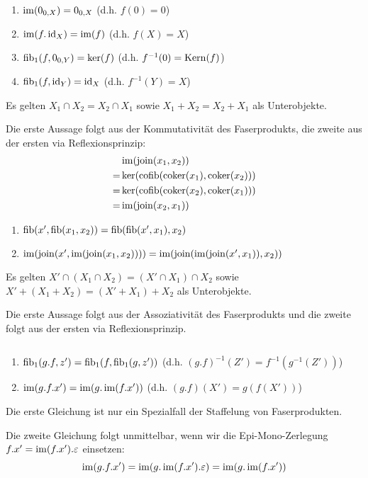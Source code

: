 \begin{lemm}[Regel (a)] $\quad$ %
\begin{enumerate}
\item $\operatorname{im}(0_{0,X}) = 0_{0,X}$ (d.h. $f(0) = 0$)
\item $\operatorname{im}(f.\operatorname{id}_X) = \operatorname{im}(f)$ (d.h. $f(X) = X$)
\item $\operatorname{fib}_1(f,0_{0,Y}) = \ker(f)$ (d.h. $f^{-1}(0) = \operatorname{Kern}(f)$)
\item $\operatorname{fib}_1(f,\operatorname{id}_Y) = \operatorname{id}_X$ (d.h. $f^{-1}(Y) = X$)
\end{enumerate}
\end{lemm}

\begin{lemm}[Regel (b)]
Es gelten $X_1 \cap X_2 = X_2 \cap X_1$
sowie $X_1 + X_2 = X_2 + X_1$ als Unterobjekte.
\end{lemm}
\begin{bew}
Die erste Aussage folgt aus der Kommutativität des Faserprodukts, die zweite aus der ersten via Reflexionsprinzip:
\begin{align*}
   & \operatorname{im}(\operatorname{join}(x_1,x_2))
\\=& \ker(\operatorname{cofib}(\operatorname{coker}(x_1),\operatorname{coker}(x_2)))
\\=& \ker(\operatorname{cofib}(\operatorname{coker}(x_2),\operatorname{coker}(x_1)))
\\=& \operatorname{im}(\operatorname{join}(x_2,x_1))
\end{align*}
\end{bew}

\begin{lemm}[Regel (c)]
\begin{enumerate}
\item $\operatorname{fib}(x',\operatorname{fib}(x_1,x_2)) = \operatorname{fib}(\operatorname{fib}(x',x_1),x_2)$
\item $\operatorname{im}(\operatorname{join}(x',\operatorname{im}(\operatorname{join}(x_1,x_2)))) = \operatorname{im}(\operatorname{join}(\operatorname{im}(\operatorname{join}(x',x_1)),x_2))$
\end{enumerate}
Es gelten $X' \cap (X_1 \cap X_2) = (X' \cap X_1) \cap X_2$ 
sowie $X' + (X_1 + X_2) = (X' + X_1) + X_2$ als Unterobjekte.
\end{lemm}
\begin{bew}
Die erste Aussage folgt aus der Assoziativität des Faserprodukts und die zweite folgt aus der ersten via Reflexionsprinzip.
\end{bew}

\begin{lemm}[Regel (d)] $\quad$ %
\begin{enumerate}
\item $\operatorname{fib}_1(g.f, z') = \operatorname{fib}_1(f, \operatorname{fib}_1(g, z'))$ (d.h. $(g.f)^{-1}(Z') = f^{-1}(g^{-1}(Z'))$)
\item $\operatorname{im}(g.f.x') = \operatorname{im}(g.\operatorname{im}(f.x'))$ (d.h. $(g.f)(X') = g(f(X'))$)
\end{enumerate}
\end{lemm}
\begin{bew}
Die erste Gleichung ist nur ein Spezialfall der Staffelung von Faserprodukten.

Die zweite Gleichung folgt unmittelbar, wenn wir die Epi-Mono-Zerlegung $f.x' = \operatorname{im}(f.x').\varepsilon$ einsetzen:
\[\operatorname{im}(g.f.x') = \operatorname{im}(g.\operatorname{im}(f.x').\varepsilon) = \operatorname{im}(g.\operatorname{im}(f.x')) \]
\end{bew}

